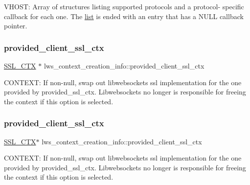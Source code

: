 V\+H\+O\+ST\+: Array of structures listing supported protocols and a protocol-\/ specific callback for each one. The \hyperlink{protocollist-p}{list} is ended with an entry that has a N\+U\+LL callback pointer. \mbox{\label{structlws__context__creation__info_a36eb10f9029ecf72498d267ee7fc6ebb}} 
\subsubsection{\texorpdfstring{provided\+\_\+client\+\_\+ssl\+\_\+ctx}{provided\_client\_ssl\_ctx}\hspace{0.1cm}{\footnotesize\ttfamily [1/2]}}
{\footnotesize\ttfamily \hyperlink{structssl__ctx__st}{S\+S\+L\+\_\+\+C\+TX} $\ast$ lws\+\_\+context\+\_\+creation\+\_\+info\+::provided\+\_\+client\+\_\+ssl\+\_\+ctx}

C\+O\+N\+T\+E\+XT\+: If non-\/null, swap out libwebsockets ssl implementation for the one provided by provided\+\_\+ssl\+\_\+ctx. Libwebsockets no longer is responsible for freeing the context if this option is selected. \mbox{\label{structlws__context__creation__info_a1654d41bea6fb2f619b57e6a264b26a4}} 
\subsubsection{\texorpdfstring{provided\+\_\+client\+\_\+ssl\+\_\+ctx}{provided\_client\_ssl\_ctx}\hspace{0.1cm}{\footnotesize\ttfamily [2/2]}}
{\footnotesize\ttfamily \hyperlink{structssl__ctx__st}{S\+S\+L\+\_\+\+C\+TX}$\ast$ lws\+\_\+context\+\_\+creation\+\_\+info\+::provided\+\_\+client\+\_\+ssl\+\_\+ctx}

C\+O\+N\+T\+E\+XT\+: If non-\/null, swap out libwebsockets ssl implementation for the one provided by provided\+\_\+ssl\+\_\+ctx. Libwebsockets no longer is responsible for freeing the context if this option is selected. \mbox{\label{structlws__context__creation__info_a57f88c0745adbd1d6b9b619b8de30209}} 
